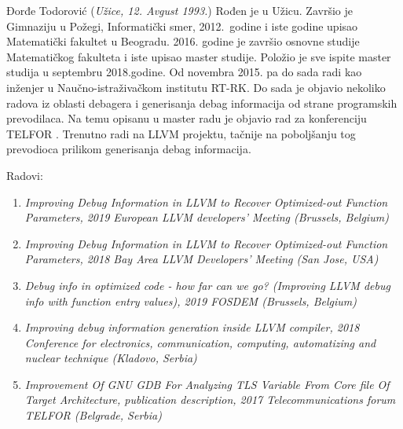 \documentclass[12pt,oneside]{memoir}
\begin{document}
\literatura

\backmatter

\begin{biografija}
Đorđe Todorović (\emph{Užice, 12. Avgust 1993.}) Rođen je u Užicu. Završio je Gimnaziju u Požegi, Informatički smer, 2012.~godine i iste godine upisao Matematički fakultet u Beogradu. 2016. godine je završio osnovne studije Matematičkog fakulteta i iste upisao master studije. Položio je sve ispite master studija u septembru 2018.godine. Od novembra 2015. pa do sada radi kao inženjer u Naučno-istraživačkom institutu RT-RK. Do sada je objavio nekoliko radova iz oblasti debagera i generisanja debag informacija od strane programskih prevodilaca. Na temu opisanu u master radu je objavio rad za konferenciju TELFOR \cite{TELFOR}. Trenutno radi na LLVM projektu, tačnije na poboljšanju tog prevodioca prilikom generisanja debag informacija.

Radovi:
\begin{enumerate}
	\item \emph{Improving Debug Information in LLVM to Recover Optimized-out Function Parameters, 2019 European LLVM developers' Meeting (Brussels, Belgium)}
	\item \emph{Improving Debug Information in LLVM to Recover Optimized-out Function Parameters, 2018 Bay Area LLVM Developers' Meeting (San Jose, USA)}
	\item \emph{Debug info in optimized code - how far can we go? (Improving LLVM debug info with function entry values), 2019 FOSDEM (Brussels, Belgium)}
	\item \emph{Improving debug information generation inside LLVM compiler, 2018 Conference for electronics, communication, computing, automatizing and nuclear technique (Kladovo, Serbia)}
	\item \emph{Improvement Of GNU GDB For Analyzing TLS Variable From Core file Of Target Architecture, publication description, 2017 Telecommunications forum TELFOR (Belgrade, Serbia)}
\end{enumerate}

\end{biografija}
\end{document}
